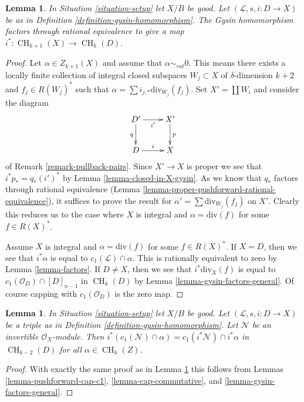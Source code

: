 \documentclass{stacks-project}
\theoremstyle{plain}
\newtheorem{lemma}[subsection]{Lemma}
\theoremstyle{definition}
\theoremstyle{remark}
\numberwithin{equation}{subsection}
\def\CH{\mathop{\mathrm{CH}}\nolimits}
\begin{document}
\begin{lemma}
\label{lemma-gysin-factors}
In Situation \ref{situation-setup} let $X/B$ be good.
Let $(\mathcal{L}, s, i : D \to X)$ be as in
Definition \ref{definition-gysin-homomorphism}.
The Gysin homomorphism factors through rational equivalence to
give a map $i^* : \CH_{k + 1}(X) \to \CH_k(D)$.
\end{lemma}

\begin{proof}
Let $\alpha \in Z_{k + 1}(X)$ and assume that $\alpha \sim_{rat} 0$.
This means there exists a locally finite collection of integral
closed subspaces $W_j \subset X$ of $\delta$-dimension $k + 2$
and $f_j \in R(W_j)^*$ such that
$\alpha = \sum i_{j, *}\text{div}_{W_j}(f_j)$.
Set $X' = \coprod W_i$ and consider the diagram
$$
\xymatrix{
D' \ar[d]_q \ar[r]_{i'} & X' \ar[d]^p \\
D \ar[r]^i & X
}
$$
of Remark \ref{remark-pullback-pairs}. Since $X' \to X$ is proper
we see that $i^*p_* = q_*(i')^*$ by Lemma \ref{lemma-closed-in-X-gysin}.
As we know that $q_*$ factors through rational equivalence
(Lemma \ref{lemma-proper-pushforward-rational-equivalence}), it suffices
to prove the result for $\alpha' = \sum \text{div}_{W_j}(f_j)$
on $X'$. Clearly this reduces us to the case where $X$ is integral
and $\alpha = \text{div}(f)$ for some $f \in R(X)^*$.

\medskip\noindent
Assume $X$ is integral and $\alpha = \text{div}(f)$ for some $f \in R(X)^*$.
If $X = D$, then we see that $i^*\alpha$ is equal
to $c_1(\mathcal{L}) \cap \alpha$.
This is rationally equivalent to zero by Lemma \ref{lemma-factors}.
If $D \not = X$, then we see that $i^*\text{div}_X(f)$ is equal to
$c_1(\mathcal{O}_D) \cap [D]_{n - 1}$ in $\CH_k(D)$ by
Lemma \ref{lemma-gysin-factors-general}. Of course
capping with $c_1(\mathcal{O}_D)$ is the zero map.
\end{proof}

\begin{lemma}
\label{lemma-gysin-commutes-cap-c1}
In Situation \ref{situation-setup} let $X/B$ be good.
Let $(\mathcal{L}, s, i : D \to X)$
be a triple as in Definition \ref{definition-gysin-homomorphism}.
Let $\mathcal{N}$ be an invertible $\mathcal{O}_X$-module.
Then $i^*(c_1(\mathcal{N}) \cap \alpha) = c_1(i^*\mathcal{N}) \cap i^*\alpha$
in $\CH_{k - 2}(D)$ for all $\alpha \in \CH_k(Z)$.
\end{lemma}

\begin{proof}
With exactly the same proof as in Lemma \ref{lemma-gysin-factors}
this follows from Lemmas
\ref{lemma-pushforward-cap-c1},
\ref{lemma-cap-commutative}, and
\ref{lemma-gysin-factors-general}.
\end{proof}
\end{document}
